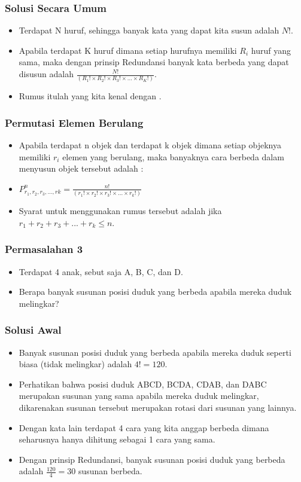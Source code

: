 \begin{frame}
\frametitle{Solusi Secara Umum}
\begin{itemize}
  \item Terdapat N huruf, sehingga banyak kata yang dapat kita susun adalah $N!$.
  \item Apabila terdapat K huruf dimana setiap hurufnya memiliki $R_{i}$ huruf yang sama, maka dengan prinsip Redundansi banyak kata berbeda yang dapat disusun adalah $\frac{N!}{(R_{1}! \times R_{2}! \times R_{3}! \times ... \times R_{K}!)}$.
  \item Rumus itulah yang kita kenal dengan .
\end{itemize}
\end{frame}

\begin{frame}
\frametitle{Permutasi Elemen Berulang}
\begin{itemize}
  \item Apabila terdapat n objek dan terdapat k objek dimana setiap objeknya memiliki $r_{i}$ elemen yang berulang, maka banyaknya cara berbeda dalam menyusun objek tersebut adalah :
  \item $P^{n}_{r_{1},r_{2},r_{3},...,r{k}} = \frac{n!}{(r_{1}! \times r_{2}! \times r_{3}! \times ... \times r_{k}!)}$ 
  \item Syarat untuk menggunakan rumus tersebut adalah jika $r_{1} + r_{2} + r_{3} + ... + r_{k} \leq n$.
\end{itemize}
\end{frame}

\begin{frame}
\frametitle{Permasalahan 3}
\begin{itemize}
  \item Terdapat 4 anak, sebut saja A, B, C, dan D.
  \item Berapa banyak susunan posisi duduk yang berbeda apabila mereka duduk melingkar?
\end{itemize}
\end{frame}

\begin{frame}
\frametitle{Solusi Awal}
\begin{itemize}
  \item Banyak susunan posisi duduk yang berbeda apabila mereka duduk seperti biasa (tidak melingkar) adalah $4! = 120$.
  \item Perhatikan bahwa posisi duduk ABCD, BCDA, CDAB, dan DABC merupakan susunan yang sama apabila mereka duduk melingkar, dikarenakan susunan tersebut merupakan rotasi dari susunan yang lainnya.
  \item Dengan kata lain terdapat 4 cara yang kita anggap berbeda dimana seharusnya hanya dihitung sebagai 1 cara yang sama.
  \item Dengan prinsip Redundansi, banyak susunan posisi duduk yang berbeda adalah $\frac{120}{4} = 30$ susunan berbeda.
\end{itemize}
\end{frame}


